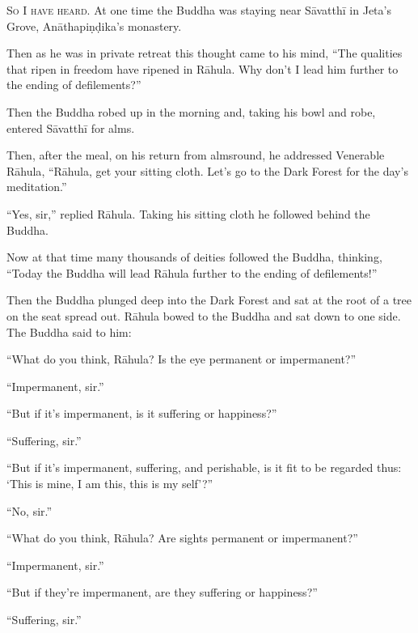 \documentclass[12pt,openany]{book}%
\newcommand*{\scevam}[1]{\textsc{#1}}
\begin{document}
\scevam{So I have heard. }At one time the Buddha was staying near \textsanskrit{Sāvatthī} in Jeta’s Grove, \textsanskrit{Anāthapiṇḍika}’s monastery. 

Then as he was in private retreat this thought came to his mind, “The qualities that ripen in freedom have ripened in \textsanskrit{Rāhula}. Why don’t I lead him further to the ending of defilements?” 

Then the Buddha robed up in the morning and, taking his bowl and robe, entered \textsanskrit{Sāvatthī} for alms. 

Then, after the meal, on his return from almsround, he addressed Venerable \textsanskrit{Rāhula}, “\textsanskrit{Rāhula}, get your sitting cloth. Let’s go to the Dark Forest for the day’s meditation.” 

“Yes, sir,” replied \textsanskrit{Rāhula}. Taking his sitting cloth he followed behind the Buddha. 

Now at that time many thousands of deities followed the Buddha, thinking, “Today the Buddha will lead \textsanskrit{Rāhula} further to the ending of defilements!” 

Then the Buddha plunged deep into the Dark Forest and sat at the root of a tree on the seat spread out. \textsanskrit{Rāhula} bowed to the Buddha and sat down to one side. The Buddha said to him: 

“What do you think, \textsanskrit{Rāhula}? Is the eye permanent or impermanent?” 

“Impermanent, sir.” 

“But if it’s impermanent, is it suffering or happiness?” 

“Suffering, sir.” 

“But if it’s impermanent, suffering, and perishable, is it fit to be regarded thus: ‘This is mine, I am this, this is my self’?” 

“No, sir.” 

“What do you think, \textsanskrit{Rāhula}? Are sights permanent or impermanent?” 

“Impermanent, sir.” 

“But if they're impermanent, are they suffering or happiness?” 

“Suffering, sir.” 
\end{document}

